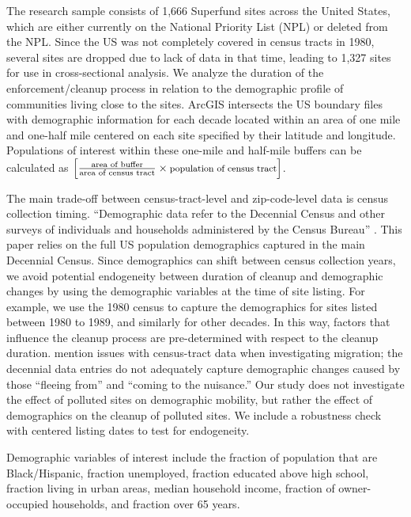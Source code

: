 \documentclass[12pt]{article}
\begin{document}
The research sample consists of 1,666 Superfund sites across the United States, which are either currently on the National Priority List (NPL) or deleted from the NPL. Since the US was not completely covered in census tracts in 1980, several sites are dropped due to lack of data in that time, leading to 1,327 sites for use in cross-sectional analysis. We analyze the duration of the enforcement/cleanup process in relation to the demographic profile of communities living close to the sites. ArcGIS intersects the US boundary files with demographic information for each decade located within an area of one mile and one-half mile centered on each site specified by their latitude and longitude. Populations of interest within these one-mile and half-mile buffers can be calculated as $\Big[\frac{\text {area of buffer}}{\text {area of census tract}}\times \text {\footnotesize population of census tract}\Big]$. 

The main trade-off between census-tract-level and zip-code-level data is census collection timing. ``Demographic data refer to the Decennial Census and other surveys of individuals and households administered by the Census Bureau'' \parencite{USCensus}. This paper relies on the full US population demographics captured in the main Decennial Census. 
Since demographics can shift between census collection years, we avoid potential endogeneity between duration of cleanup and demographic changes by using the demographic variables at the time of site listing. For example, we use the 1980 census to capture the demographics for sites listed between 1980 to 1989, and similarly for other decades. In this way, factors that influence the cleanup process are pre-determined with respect to the cleanup duration. {\textcite{Depro2015} mention issues with census-tract data when investigating migration; the decennial data entries do not adequately capture demographic changes caused by those ``fleeing from'' and ``coming to the nuisance.'' Our study does not investigate the effect of polluted sites on demographic mobility, but rather the effect of demographics on the cleanup of polluted sites. We include a robustness check with centered listing dates to test for endogeneity.} %

Demographic variables of interest include the fraction of population that are Black/Hispanic, fraction unemployed, fraction educated above high school, fraction living in urban areas, median household income, fraction of owner-occupied households, and fraction over 65 years.%
\end{document}
